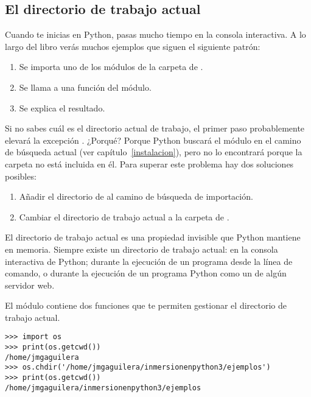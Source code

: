 \subsection{El directorio de trabajo actual}

Cuando te inicias en Python, pasas mucho tiempo en la consola interactiva. A lo largo del libro verás muchos ejemplos que siguen el siguiente patrón:

\begin{enumerate}

\item Se importa uno de los módulos de la carpeta de .

\item Se llama a una función del módulo.

\item Se explica el resultado.

\end{enumerate}

Si no sabes cuál es el directorio actual de trabajo, el primer paso probablemente elevará la excepción . ¿Porqué? Porque Python buscará el módulo en el camino de búsqueda actual (ver capítulo~\ref{instalacion}), pero no lo encontrará porque la carpeta  no está incluida en él. Para superar este problema hay dos soluciones posibles:

\begin{enumerate}

\item Añadir el directorio de  al camino de búsqueda de importación.

\item Cambiar el directorio de trabajo actual a la carpeta de .

\end{enumerate}

El directorio de trabajo actual es una propiedad invisible que Python mantiene en memoria. Siempre existe un directorio de trabajo actual: en la consola interactiva de Python; durante la ejecución de un programa desde la línea de comando, o durante la ejecución de un programa Python como un  de algún servidor web.

El módulo  contiene dos funciones que te permiten gestionar el directorio de trabajo actual.

\noindent\begin{minipage}{\textwidth}
\begin{lstlisting}[mathescape=True]
>>> import os
>>> print(os.getcwd())
/home/jmgaguilera
>>> os.chdir('/home/jmgaguilera/inmersionenpython3/ejemplos')
>>> print(os.getcwd())
/home/jmgaguilera/inmersionenpython3/ejemplos
\end{lstlisting}
\end{minipage}

